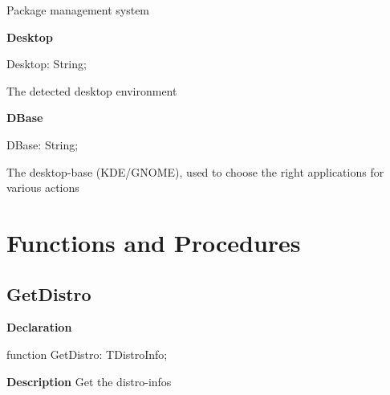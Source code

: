 \documentclass{report}
\newif\ifpdf
\begin{document}
\begin{list}{}
\begin{flushleft}
\ifpdf
\end{flushleft}
\fi


\par Package management system\label{distri.TDistroInfo-Desktop}
\item[\textbf{Desktop}\hfill]
\ifpdf
\begin{flushleft}
\fi
\begin{ttfamily}
Desktop: String;\end{ttfamily}

\ifpdf
\end{flushleft}
\fi


\par The detected desktop environment\label{distri.TDistroInfo-DBase}
\item[\textbf{DBase}\hfill]
\ifpdf
\begin{flushleft}
\fi
\begin{ttfamily}
DBase: String;\end{ttfamily}

\ifpdf
\end{flushleft}
\fi


\par The desktop{-}base (KDE/GNOME), used to choose the right applications for various actions\end{list}
\section{Functions and Procedures}
\ifpdf
\subsection*{\large{\textbf{GetDistro}}\normalsize\hspace{1ex}\hrulefill}
\else
\subsection*{GetDistro}
\fi
\label{distri-GetDistro}
\begin{list}{}{
\setlength{\itemindent}{0cm}
\setlength{\listparindent}{0cm}
\setlength{\leftmargin}{\evensidemargin}
\addtolength{\leftmargin}{\tmplength}
\settowidth{\labelsep}{X}
\addtolength{\leftmargin}{\labelsep}
\setlength{\labelwidth}{\tmplength}
}
\item[\textbf{Declaration}\hfill]
\ifpdf
\begin{flushleft}
\fi
\begin{ttfamily}
function GetDistro: TDistroInfo;\end{ttfamily}

\ifpdf
\end{flushleft}
\fi

\par
\item[\textbf{Description}]
Get the distro{-}infos

\end{list}
\ifpdf
\end{document}
